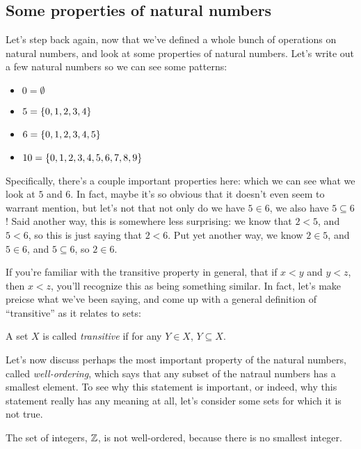 
\subsection{Some properties of natural numbers}

Let's step back again, now that we've defined a whole bunch of operations on natural numbers, and look at some properties of natural numbers.
Let's write out a few natural numbers so we can see some patterns:

\begin{itemize}
    \item[] $0 = \emptyset$
    \item[] $5 = {\left\{ {0,1,2,3,4} \right\}}$
    \item[] $6 = {\left\{ {0,1,2,3,4,5} \right\}}$
    \item[] $10 = {\left\{ {0,1,2,3,4,5,6,7,8,9} \right\}}$
\end{itemize}

Specifically, there's a couple important properties here: which we can see what we look at $5$ and $6$.
In fact, maybe it's so obvious that it doesn't even seem to warrant mention, but let's not that not only do we have $5 \in 6$, we also have $5 \subseteq 6$!
Said another way, this is somewhere less surprising: we know that $2 < 5$, and $5 < 6$, so this is just saying that $2 < 6$.
Put yet another way, we know $2 \in 5$, and $5 \in 6$, and $5 \subseteq 6$, so $2 \in 6$.

If you're familiar with the transitive property in general, that if $x < y$ and $y < z$, then $x < z$, you'll recognize this as being something similar.
In fact, let's make preicse what we've been saying, and come up with a general definition of ``transitive'' as it relates to sets:

\begin{definition}
    A set $X$ is called \emph{transitive} if for any $Y \in X$, $Y \subseteq X$.
\end{definition}

Let's now discuss perhaps the most important property of the natural numbers, called \emph{well-ordering}, which says that any subset of the natraul numbers has a smallest element.
To see why this statement is important, or indeed, why this statement really has any meaning at all, let's consider some sets for which it is not true.

\begin{example}
    The set of integers, $\mathbb{Z}$, is not well-ordered, because there is no smallest integer.
\end{example}

